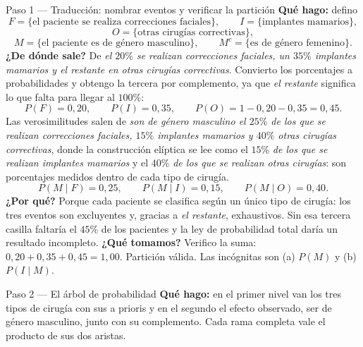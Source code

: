 \documentclass[11pt]{article}
\begin{document}
\begin{sol}

\begin{paso}{Paso 1 --- Traducción: nombrar eventos y verificar la partición}
\textbf{Qué hago:} defino
\[
F=\{\text{el paciente se realiza correcciones faciales}\},\qquad I=\{\text{implantes mamarios}\},
\]
\[
O=\{\text{otras cirugías correctivas}\},
\]
\[
M=\{\text{el paciente es de género masculino}\},\qquad M^{c}=\{\text{es de género femenino}\}.
\]
\textbf{¿De dónde sale?} De \emph{el $20\%$ se realizan correcciones faciales, un $35\%$ implantes mamarios y el restante en otras cirugías correctivas}. Convierto los porcentajes a probabilidades y obtengo la tercera por complemento, ya que \emph{el restante} significa lo que falta para llegar al $100\%$:
\[
P(F)=0,20,\qquad P(I)=0,35,\qquad P(O)=1-0,20-0,35=0,45 .
\]
Las verosimilitudes salen de \emph{son de género masculino el $25\%$ de los que se realizan correcciones faciales, $15\%$ implantes mamarios y $40\%$ otras cirugías correctivas}, donde la construcción elíptica se lee como el $15\%$ \emph{de los que se realizan implantes mamarios} y el $40\%$ \emph{de los que se realizan otras cirugías}: son porcentajes medidos dentro de cada tipo de cirugía.
\[
P(M\mid F)=0,25,\qquad P(M\mid I)=0,15,\qquad P(M\mid O)=0,40 .
\]
\textbf{¿Por qué?} Porque cada paciente se clasifica según un único tipo de cirugía: los tres eventos son excluyentes y, gracias a \emph{el restante}, exhaustivos. Sin esa tercera casilla faltaría el $45\%$ de los pacientes y la ley de probabilidad total daría un resultado incompleto.
\textbf{¿Qué tomamos?} Verifico la suma: $0,20+0,35+0,45=1,00$. Partición válida. Las incógnitas son (a) $P(M)$ y (b) $P(I\mid M)$.
\end{paso}

\begin{paso}{Paso 2 --- El árbol de probabilidad}
\textbf{Qué hago:} en el primer nivel van los tres tipos de cirugía con sus a prioris y en el segundo el efecto observado, ser de género masculino, junto con su complemento. Cada rama completa vale el producto de sus dos aristas.

\begin{center}
\shorthandoff{<>}
\end{center}
\end{paso}
\end{sol}
\end{document}
